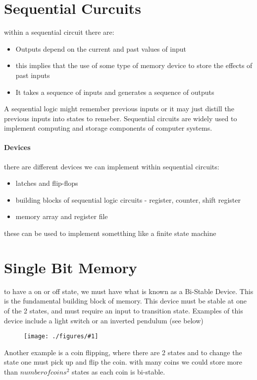 \documentclass[12pt]{book}
\title{\coursetitle\linebreak\lecturename}
\author{\\Cain Susko\\ 
           \\ \\ \\
      Queen's University 
    \\School of Computing\\}
\newcommand{\incimg}[2]{%
       \begin{figure}[h]
               \centering
               \texttt{[image: ./figures/\#1]}
       \end{figure}
}
\begin{document}
\begin{titlepage}
        \maketitle
\end{titlepage}


\section*{Sequential Curcuits}
within a sequential circuit there are: 
\begin{itemize}
        \item Outputs depend on the current and past values of input
        \item this implies that the use of some type of memory device to store the effects of past 
                inputs
        \item It takes a sequence of inputs and generates a sequence of outputs
\end{itemize}
A sequential logic might remember previous inputs or it may just distill the previous inputs into
states to remeber.
Sequential circuits are widely used to implement computing and storage components of computer
systems.

\paragraph{Devices}
there are different devices we can implement within sequential circuits:
\begin{itemize}
        \item latches and flip-flops
        \item building blocks of sequential logic circuits - register, counter, shift register
        \item memory array and register file
\end{itemize}
these can be used to implement sometthing like a finite state machine

\section*{Single Bit Memory}
to have a on or off state, we must have what is known as a Bi-Stable Device. This is
the fundamental building block of memory. This device must be stable at one of the 2 states,
and must require an input to transition state. Examples of this device include a light switch
or an inverted pendulum (see below)
\incimg{pendulum}{0.5}
Another example is a coin flipping, where there are 2 states and to change the state one must pick
up and flip the coin. with many coins we could store more than $number of coins^2$
states as each coin is bi-stable.
\end{document}
